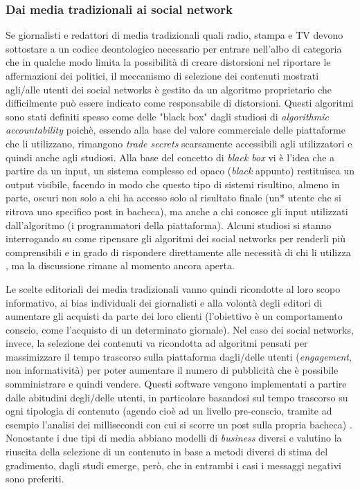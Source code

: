 \subsubsection{Dai media tradizionali ai social network}
Se giornalisti e redattori di media tradizionali quali radio, stampa e TV devono sottostare a un codice deontologico necessario per entrare nell'albo di categoria che in qualche modo limita la possibilità di creare distorsioni nel riportare le affermazioni dei politici, il meccanismo di selezione dei contenuti mostrati agli/alle utenti dei social networks è gestito da un algoritmo proprietario che difficilmente può essere indicato come responsabile di distorsioni. Questi algoritmi sono stati definiti spesso come delle "black box" \citep{pasquale2015} dagli studiosi di \textit{algorithmic accountability} poichè, essendo alla base del valore commerciale delle piattaforme che li utilizzano, rimangono \textit{trade secrets} scarsamente accessibili agli utilizzatori e quindi anche agli studiosi. Alla base del concetto di \textit{black box} vi è  l'idea che a partire da un input, un sistema complesso ed opaco (\textit{black} appunto) restituisca un output visibile, facendo in modo che questo tipo di sistemi risultino, almeno in parte, oscuri non solo a chi ha accesso solo al risultato finale (un* utente che si ritrova uno specifico post in bacheca), ma anche a chi conosce gli input utilizzati dall'algoritmo (i programmatori della piattaforma). Alcuni studiosi si stanno interrogando su come ripensare gli algoritmi dei social networks per renderli più comprensibili e in grado di rispondere direttamente alle necessità di chi li utilizza \citep{reviglio2020}, ma la discussione rimane al momento ancora aperta.

Le scelte editoriali dei media tradizionali vanno quindi ricondotte al loro scopo informativo, ai bias individuali dei giornalisti e alla volontà degli editori di aumentare gli acquisti da parte dei loro clienti (l'obiettivo è un comportamento conscio, come l'acquisto di un determinato giornale). Nel caso dei social networks, invece, la selezione dei contenuti va ricondotta ad algoritmi pensati per massimizzare il tempo trascorso sulla piattaforma dagli/delle utenti (\textit{engagement}, non informatività) per poter aumentare il numero di pubblicità che è possibile somministrare e quindi vendere. Questi software vengono implementati a partire dalle abitudini degli/delle utenti, in particolare basandosi sul tempo trascorso su ogni tipologia di contenuto (agendo cioè ad un livello pre-conscio, tramite ad esempio l'analisi dei millisecondi con cui si scorre un post sulla propria bacheca) \citep{han2017}. Nonostante i due tipi di media abbiano modelli di \textit{business} diversi e valutino la riuscita della selezione di un contenuto in base a metodi diversi di stima del gradimento, dagli studi emerge, però, che in entrambi i casi i messaggi negativi sono preferiti.


